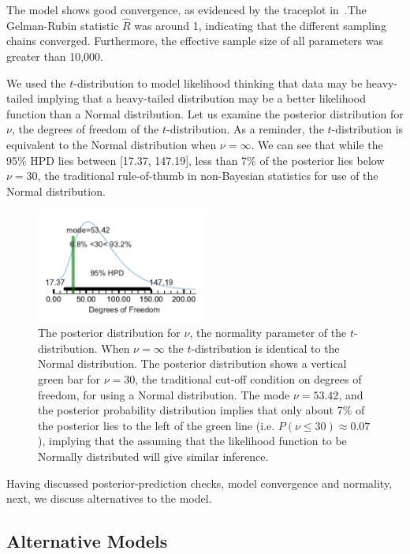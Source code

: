 The model shows good convergence, as evidenced by the traceplot in~.The Gelman-Rubin statistic $\hat{R}$ was around 1, indicating that the different sampling chains converged. Furthermore, the effective sample size of all parameters was greater than 10,000.

We used the $t$-distribution to model likelihood thinking that data may be heavy-tailed implying that a heavy-tailed distribution may be a better likelihood function than a  Normal distribution. Let us examine the posterior distribution for $\nu$, the degrees of freedom of the $t$-distribution. As a reminder, the $t$-distribution is equivalent to the Normal distribution when $\nu=\infty$. We can see that while the 95\% HPD lies between [17.37, 147.19], less than 7\% of the posterior lies below $\nu=30$, the traditional rule-of-thumb in non-Bayesian statistics for use of the Normal distribution.


\begin{figure}[htb]
    \includegraphics[width=0.5\textwidth]{./hari-code/robust_normality.pdf}
    \caption{The posterior distribution for $\nu$, the normality parameter of the $t$-distribution. When $\nu=\infty$ the $t$-distribution is identical to the Normal distribution. The posterior distribution shows a vertical green bar for $\nu=30$, the traditional cut-off condition on degrees of freedom, for using a Normal distribution. The mode $\nu=53.42$, and the posterior probability distribution implies that only about 7\% of the posterior lies to the left of the green line (i.e. $P(\nu \leq 30) \approx 0.07$), implying that the assuming that the likelihood function to be Normally distributed will give similar inference.}
    \label{fig:normality}
\end{figure}

Having discussed posterior-prediction checks, model convergence and normality, next, we discuss alternatives to the model.

\subsection{Alternative Models}
\label{sub:Alternative Models}


